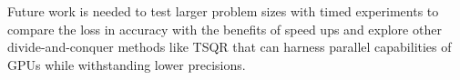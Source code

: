 \documentclass[review,onefignum,onetabnum]{siamart190516}
\begin{document}
Future work is needed to test larger problem sizes with timed experiments to compare the loss in accuracy with the benefits of speed ups and 
explore other divide-and-conquer methods like TSQR that can harness parallel capabilities of GPUs while withstanding lower precisions. 
%
%

\end{document}
